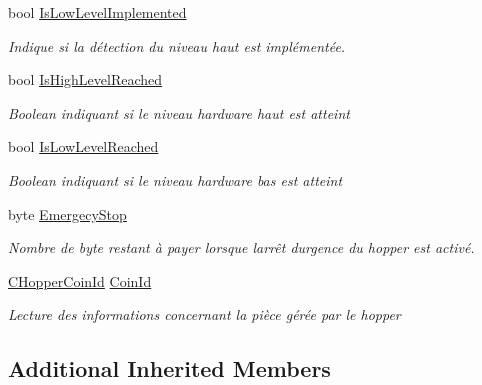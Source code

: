 \begin{DoxyCompactItemize}
bool \mbox{\hyperlink{class_device_library_1_1_c_hopper_a15324622637cfb57c9a24f321d55a496}{Is\+Low\+Level\+Implemented}}
\begin{DoxyCompactList}\small\item\em Indique si la détection du niveau haut est implémentée. \end{DoxyCompactList}\item 
bool \mbox{\hyperlink{class_device_library_1_1_c_hopper_a4f4d3bcff66d7377ab203313ab1778f8}{Is\+High\+Level\+Reached}}
\begin{DoxyCompactList}\small\item\em Boolean indiquant si le niveau hardware haut est atteint \end{DoxyCompactList}\item 
bool \mbox{\hyperlink{class_device_library_1_1_c_hopper_a04e41e117c79e3ac0c3cd3dc38d3931e}{Is\+Low\+Level\+Reached}}
\begin{DoxyCompactList}\small\item\em Boolean indiquant si le niveau hardware bas est atteint \end{DoxyCompactList}\item 
byte \mbox{\hyperlink{class_device_library_1_1_c_hopper_a1a49cc5d1094fa17df2b465c2c53f658}{Emergecy\+Stop}}
\begin{DoxyCompactList}\small\item\em Nombre de byte restant à payer lorsque l\textquotesingle{}arrêt d\textquotesingle{}urgence du hopper est activé. \end{DoxyCompactList}\item 
\mbox{\hyperlink{class_device_library_1_1_c_hopper_1_1_c_hopper_coin_id}{C\+Hopper\+Coin\+Id}} \mbox{\hyperlink{class_device_library_1_1_c_hopper_ac3540ffaafc86345d05281840157f5ad}{Coin\+Id}}
\begin{DoxyCompactList}\small\item\em Lecture des informations concernant la pièce gérée par le hopper \end{DoxyCompactList}\end{DoxyCompactItemize}
\subsection*{Additional Inherited Members}


